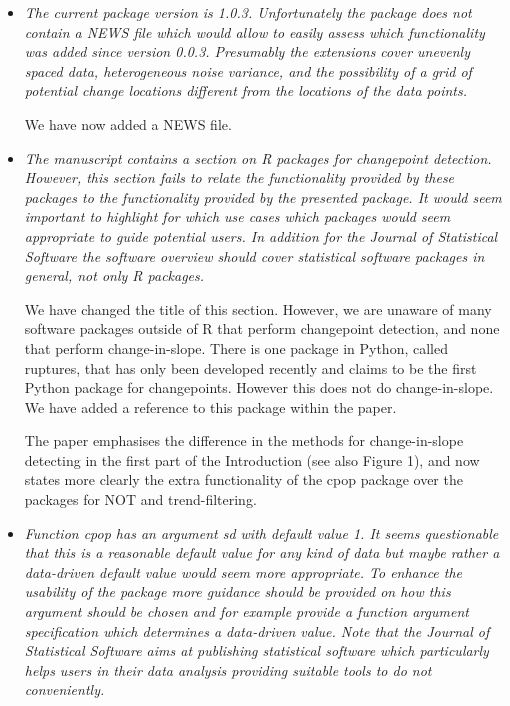 \documentclass[12pt]{article}
\begin{document}
\begin{itemize}
\item {\em The current package version is 1.0.3. Unfortunately the package does not contain a NEWS file which would allow to easily assess which functionality was added since version 0.0.3. Presumably the extensions cover unevenly spaced data, heterogeneous noise variance, and the possibility of a grid of potential change locations different from the locations of the data points.}

We have now added a NEWS file.

\item {\em The manuscript contains a section on R packages for changepoint detection. However, this section fails to relate the functionality provided by these packages to the functionality provided by the presented package. It would seem important to highlight for which use cases which packages would seem appropriate to guide potential users. In addition for the Journal of Statistical Software the software overview should cover statistical software packages in general, not only R packages.}

We have changed the title of this section. However, we are unaware of many software packages outside of R that perform changepoint detection, and none that perform change-in-slope. There is one package in Python, called ruptures, that has only been developed recently and claims to be the first Python package for changepoints. However this does not do change-in-slope. We have added a reference to this package within the paper. 

The paper emphasises the difference in the methods for change-in-slope detecting in the first part of the Introduction (see also Figure 1), and now states more clearly the extra functionality of the cpop package over the packages for NOT and trend-filtering.

\item {\em Function cpop has an argument sd with default value 1. It seems questionable that this is a reasonable default value for any kind of data but maybe rather a data-driven default value would seem more appropriate. To enhance the usability of the package more guidance should be provided on how this argument should be chosen and for example provide a function argument specification which determines a data-driven value. Note that the Journal of Statistical Software aims at publishing statistical software which particularly helps users in their data analysis providing suitable tools to do not conveniently.}


\end{itemize}
\end{document}
